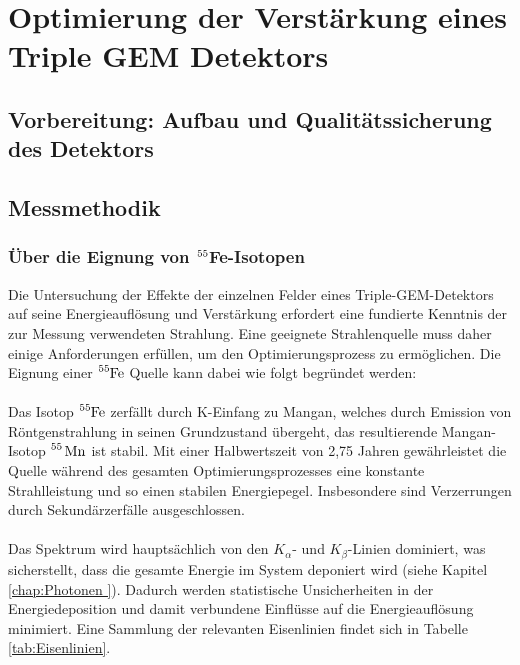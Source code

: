 \chapter{Optimierung der Verstärkung eines Triple GEM Detektors}
	\section{Vorbereitung: Aufbau und Qualitätssicherung des Detektors}
	
	\section{Messmethodik}
		\subsection{Über die Eignung von $\ce{^{55}}$Fe-Isotopen}\label{sec:Fe55}
			Die Untersuchung der Effekte der einzelnen Felder eines Triple-GEM-Detektors auf seine Energieauflösung und Verstärkung erfordert eine fundierte Kenntnis der zur Messung verwendeten Strahlung. Eine geeignete Strahlenquelle muss daher einige Anforderungen erfüllen, um den Optimierungsprozess zu ermöglichen. Die Eignung einer  $\ce{^55Fe}$ Quelle kann dabei wie folgt begründet werden:\\
			\\
			Das Isotop $\ce{^55Fe}$ zerfällt durch K-Einfang zu Mangan, welches durch Emission von Röntgenstrahlung in seinen Grundzustand übergeht, das resultierende Mangan-Isotop $\ce{^55 Mn}$ ist stabil. Mit einer Halbwertszeit von 2,75 Jahren \cite{Half_Life_FE55} gewährleistet die Quelle während des gesamten Optimierungsprozesses eine konstante Strahlleistung und so einen stabilen Energiepegel. Insbesondere sind Verzerrungen durch Sekundärzerfälle ausgeschlossen.\\
			\\
			Das Spektrum wird hauptsächlich von den $K_{\alpha}$- und $K_{\beta}$-Linien dominiert, was sicherstellt, dass die gesamte Energie im System deponiert wird (siehe Kapitel \ref{chap:Photonen
			}). Dadurch werden statistische Unsicherheiten in der Energiedeposition und damit verbundene Einflüsse auf die Energieauflösung minimiert. Eine Sammlung der relevanten Eisenlinien findet sich in Tabelle \ref{tab:Eisenlinien}.
			
